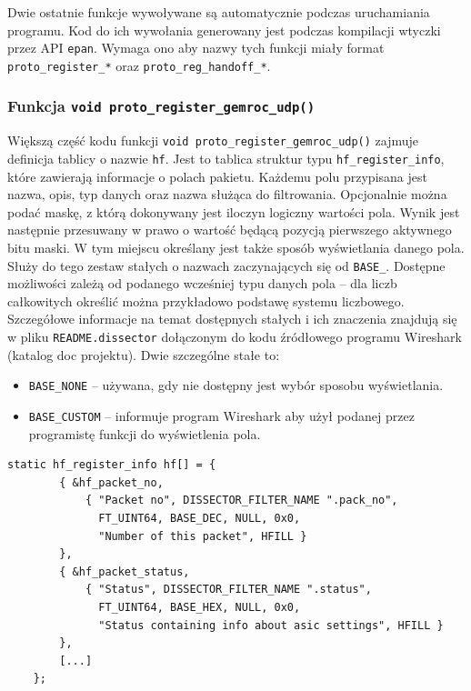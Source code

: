 \documentclass[a4paper, 12pt, twoside, openright]{article}
\begin{document}
	Dwie ostatnie funkcje wywoływane są automatycznie podczas uruchamiania programu. Kod do ich wywołania generowany jest
	podczas kompilacji wtyczki przez API \texttt{epan}. Wymaga ono aby nazwy tych funkcji miały format \texttt{proto\_register\_*} oraz
	\texttt{proto\_reg\_handoff\_*}.

	\subsubsection{Funkcja \texttt{void proto\_register\_gemroc\_udp()}}

	\indent\par
	Większą część kodu funkcji \texttt{void proto\_register\_gemroc\_udp()} zajmuje definicja tablicy o nazwie \texttt{hf}.
	Jest to tablica struktur typu \texttt{hf\_register\_info}, które zawierają informacje o polach pakietu. Każdemu polu przypisana
	jest nazwa, opis, typ danych oraz nazwa służąca do filtrowania. Opcjonalnie można podać maskę, z którą dokonywany jest iloczyn logiczny
	wartości pola. Wynik jest następnie przesuwany w prawo o wartość będącą pozycją pierwszego aktywnego bitu maski.
	W tym miejscu określany jest także sposób wyświetlania danego pola. Służy do tego zestaw stałych o nazwach
	zaczynających się od \texttt{BASE\_}. Dostępne możliwości zależą od podanego wcześniej typu danych pola -- dla liczb całkowitych
	określić można przykładowo podstawę systemu liczbowego. Szczegółowe informacje na temat dostępnych stałych i ich znaczenia
	znajdują się w pliku \texttt{README.dissector} dołączonym do kodu źródłowego programu Wireshark (katalog doc projektu).
	Dwie szczególne stałe to:
	\begin{itemize}
		\item \texttt{BASE\_NONE} -- używana, gdy nie dostępny jest wybór sposobu wyświetlania.
		\item \texttt{BASE\_CUSTOM} -- informuje program Wireshark aby użył podanej przez programistę funkcji do wyświetlenia pola.
	\end{itemize}

	\begin{lstlisting}[style=CStyle]
	static hf_register_info hf[] = {
		{ &hf_packet_no,
			{ "Packet no", DISSECTOR_FILTER_NAME ".pack_no",
			  FT_UINT64, BASE_DEC, NULL, 0x0,
			  "Number of this packet", HFILL }
		},
		{ &hf_packet_status,
			{ "Status", DISSECTOR_FILTER_NAME ".status",
			  FT_UINT64, BASE_HEX, NULL, 0x0,
			  "Status containing info about asic settings", HFILL }
		},
		[...]
	};

	\end{lstlisting}
\end{document}
